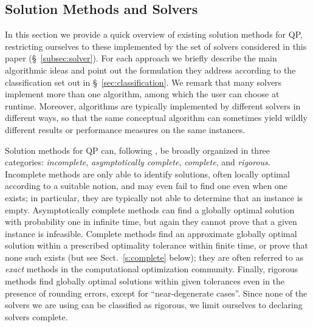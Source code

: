 
\subsection{Solution Methods and Solvers}\label{sec:algo}

In this section we provide a quick overview of existing solution methods for QP, restricting ourselves to these implemented by the set of solvers considered in this paper (\S~\ref{subsec:solver}). For each approach we briefly describe the main algorithmic ideas and point out the formulation they address according to the classification set out in \S~\ref{sec:classification}. We remark that many solvers implement more than one algorithm, among which the user can choose at runtime. Moreover, algorithms are typically implemented by different solvers in different ways, so that the same conceptual algorithm can sometimes yield wildly different results or performance measures on the same instances.

Solution methods for QP can, following \cite{neumaier}, be broadly organized in three categories: \emph{incomplete}, \emph{asymptotically complete}, \emph{complete}, and \emph{rigorous}. Incomplete methods are only able to identify solutions, often locally optimal according to a suitable notion, and may even fail to find one even when one exists; in particular, they are typically not able to determine that an instance is empty. Asymptotically complete methods can find a globally optimal solution with probability one in infinite time, but again they cannot prove that a given instance is infeasible. Complete methods find an approximate globally optimal solution within a prescribed optimality tolerance within finite time, or prove that none such exists (but see Sect.~\ref{s:complete} below); they are often referred to as \emph{exact} methods in the computational optimization community. Finally, rigorous methods find globally optimal solutions within given tolerances even in the presence of rounding errors, except for ``near-degenerate cases''. Since none of the solvers we are using can be classified as rigorous, we limit ourselves to declaring solvers complete.

